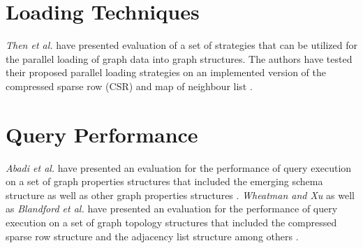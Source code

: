 {\section{Loading Techniques}
\label{sec:relatedWork-loading}

\textit{Then et al.} have presented evaluation of a set of strategies that can be utilized for the parallel loading of graph data into graph structures. The authors have tested their proposed parallel loading strategies on an implemented version of the compressed sparse row (CSR) and map of neighbour list \cite{then2016evaluation}.

\section{Query Performance}
\label{sec:relatedWork-query}

\textit{Abadi et al.} have presented an evaluation for the performance of query execution on a set of graph properties structures that included the emerging schema structure as well as other graph properties structures \cite{abadi2007scalable}. \textit{Wheatman and Xu} as well as \textit{Blandford et al.} have presented an evaluation for the performance of query execution on a set of graph topology structures that included the compressed sparse row structure and the adjacency list structure among others \cite{wheatmanpacked,blandford2004experimental}.



}